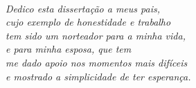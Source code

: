 
\ 

\vfill

\begin{flushright}
\hfill \textit{Dedico esta dissertação a meus pais,\\ cujo exemplo de honestidade e trabalho\\ tem sido um norteador para a minha vida,\\ e para minha esposa, que tem\\ me dado apoio nos momentos mais difíceis\\ e mostrado a simplicidade de ter esperança.}
\end{flushright}

\vspace*{1cm}

\clearpage
